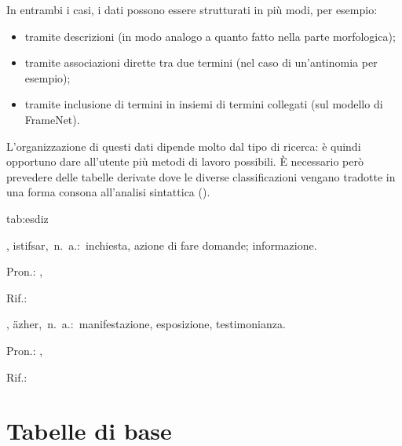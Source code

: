 \documentclass[twoside,stylearticle,11pt,filologia,it,article,bibsection]{spinoza}
\begin{document}
In entrambi i casi, i dati possono essere strutturati in più modi, per
esempio:
\begin{itemize}
\item tramite descrizioni (in modo analogo a quanto fatto nella parte
  morfologica);
\item tramite associazioni dirette tra due termini (nel caso di
  un'antinomia per esempio);
\item tramite inclusione di termini in insiemi di termini collegati
  (sul modello di FrameNet).
\end{itemize}

L'organizzazione di questi dati dipende molto dal tipo di ricerca: è
quindi opportuno dare all'utente più metodi di lavoro possibili. È
necessario però prevedere delle tabelle derivate dove le diverse
classificazioni vengano tradotte in una forma consona all'analisi
sintattica (\vedi {}).

  {tab:esdiz}{\vspace{-1em}\begin{glossario}{}
\item[\spzrl{istifsAr},] {\sf istifsar},\ n.\ a.:\ inchiesta, azione di fare domande; informazione.
\begin{subvocedue}
\item[Pron.:] , 
\item[Rif.:] 
\end{subvocedue}
\item[\spzrl{i.zhAr},] {\sf äzher},\ n.\ a.:\ manifestazione, esposizione, testimonianza.
\begin{subvocedue}
\item[Pron.:] , 
\item[Rif.:] 
\end{subvocedue}
\end{glossario}}

\section{Tabelle di base}
\label{sec:tabbase}
\end{document}
